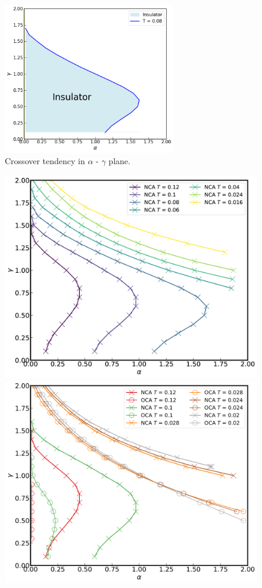 \documentclass{article}
\begin{document}
\begin{spacing}{1.3}
\begin{figure}[H]
  \centerline{\includegraphics[width=7.5cm]{TexFigure/4/4_3_07_Simplefig.png}}
  \caption{Crossover tendency in $\alpha$ - $\gamma$ plane.}
\end{figure}
\pagebreak
\newpage
\begin{figure}[H]
  \centerline{\includegraphics[width=12cm]{TexFigure/4/4_3_08_3dplot_Ns3_proj_n-1.png}}
  \centerline{\includegraphics[width=12cm]{TexFigure/4/4_3_09_3dplot_COMP3_proj_n-1.png}}

\end{figure}
\end{spacing}
\end{document}
